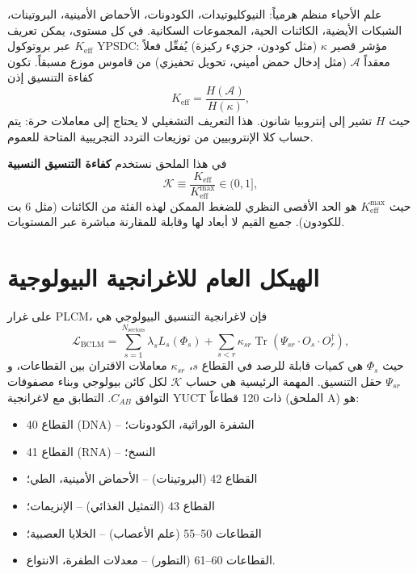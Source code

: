 \documentclass[11pt,a4paper]{article}
\newcommand{\REL}{\mathcal{K}}
\begin{document}
	علم الأحياء منظم هرمياً: النيوكليوتيدات، الكودونات، الأحماض الأمينية، البروتينات، الشبكات الأيضية، الكائنات الحية، المجموعات السكانية. في كل مستوى، يمكن تعريف \(K_{\mathrm{eff}}\) عبر بروتوكول YPSDC: مؤشر قصير \(\kappa\) (مثل كودون، جزيء ركيزة) يُفعِّل فعلاً معقداً \(\mathcal{A}\) (مثل إدخال حمض أميني، تحويل تحفيزي) من قاموس موزع مسبقاً. تكون كفاءة التنسيق إذن
	\[
	K_{\mathrm{eff}} = \frac{H(\mathcal{A})}{H(\kappa)},
	\]
	حيث \(H\) تشير إلى إنتروبيا شانون. هذا التعريف التشغيلي لا يحتاج إلى معاملات حرة: يتم حساب كلا الإنتروبيين من توزيعات التردد التجريبية المتاحة للعموم.
	
	في هذا الملحق نستخدم \textbf{كفاءة التنسيق النسبية}
	\[
	\REL \equiv \frac{K_{\mathrm{eff}}}{K_{\mathrm{eff}}^{\max}} \in (0,1],
	\]
	حيث \(K_{\mathrm{eff}}^{\max}\) هو الحد الأقصى النظري للضغط الممكن لهذه الفئة من الكائنات (مثل 6 بت للكودون). جميع القيم لا أبعاد لها وقابلة للمقارنة مباشرة عبر المستويات.
	
	\section{الهيكل العام للاغرانجية البيولوجية}
	على غرار PLCM، فإن لاغرانجية التنسيق البيولوجي هي
	\begin{equation}
		\mathcal{L}_{\text{BCLM}} = \sum_{s=1}^{N_{\text{sectors}}} \lambda_s L_s(\Phi_s) + \sum_{s<r} \kappa_{sr} \operatorname{Tr}(\Psi_{sr} \cdot O_s \cdot O_r^\dagger),
		\label{eq:BCLM}
	\end{equation}
	حيث \(\Phi_s\) هي كميات قابلة للرصد في القطاع \(s\)، \(\kappa_{sr}\) معاملات الاقتران بين القطاعات، و \(\Psi_{sr}\) حقل التنسيق. المهمة الرئيسية هي حساب \(\REL\) لكل كائن بيولوجي وبناء مصفوفات التوافق \(C_{AB}\). التطابق مع لاغرانجية YUCT ذات 120 قطاعاً (الملحق A) هو:
	\begin{itemize}
		\item القطاع 40 (DNA) – الشفرة الوراثية، الكودونات؛
		\item القطاع 41 (RNA) – النسخ؛
		\item القطاع 42 (البروتينات) – الأحماض الأمينية، الطي؛
		\item القطاع 43 (التمثيل الغذائي) – الإنزيمات؛
		\item القطاعات 50–55 (علم الأعصاب) – الخلايا العصبية؛
		\item القطاعات 60–61 (التطور) – معدلات الطفرة، الانتواع.
	\end{itemize}
	
\end{document}

